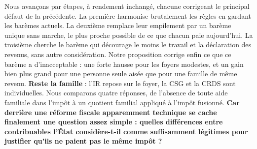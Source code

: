 \documentclass[11pt,a4paper]{article}
\begin{document}
Nous avançons par étapes, à rendement inchangé, chacune corrigeant le principal défaut de la précédente.
La première harmonise brutalement les règles en gardant les barèmes actuels. La deuxième remplace leur
empilement par un barème unique sans marche, le plus proche possible de ce que chacun paie aujourd'hui. La
troisième cherche le barème qui décourage le moins le travail et la déclaration des revenus, sans autre
considération. Notre proposition corrige enfin ce que ce barème a d'inacceptable : une forte hausse pour les
foyers modestes, et un gain bien plus grand pour une personne seule aisée que pour une famille de même
revenu. \textbf{Reste la famille} : l'IR repose sur le foyer, la CSG et la CRDS sont individuelles. Nous
comparons quatre réponses, de l'absence de toute aide familiale dans l'impôt à un quotient familial
appliqué à l'impôt fusionné. \textbf{Car derrière une réforme fiscale apparemment technique se cache
finalement une question assez simple : quelles différences entre contribuables l'État considère-t-il comme
suffisamment légitimes pour justifier qu'ils ne paient pas le même impôt ?}
\end{document}
